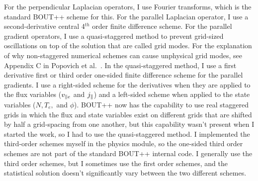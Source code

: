 For the perpendicular Laplacian operators, I use
Fourier transforms, which is the standard BOUT++ scheme for this. For the parallel Laplacian operator, I use a second-derivative central 4$^{th}$ order finite difference scheme.
For the parallel gradient operators, I use a quasi-staggered method to prevent grid-sized oscillations on top of the solution that are called grid modes. 
For the explanation of why non-staggered numerical schemes can cause unphysical grid modes, see Appendix C in Popovich et al.~\cite{popovich2010b}.
In the quasi-staggered method, I use a first derivative first or third order one-sided finite difference scheme for the parallel gradients. I use a right-sided scheme for the derivatives when
they are applied to the flux variables ($v_{\parallel e}$ and $j_\parallel$) and a left-sided scheme when applied to the state variables ($N, T_e,$ and $\phi$). BOUT++ now has the capability to use real
staggered grids in which the flux and state variables exist on different grids that are shifted by half a grid-spacing from one another, but this capability wasn't present when I started
the work, so I had to use the quasi-staggered method. I implemented the third-order schemes myself in the physics module, 
so the one-sided third order schemes are not part of the standard BOUT++ internal code. I generally use the third order schemes, but I sometimes use the first order
schemes, and the statistical solution doesn't significantly vary between the two different schemes.

